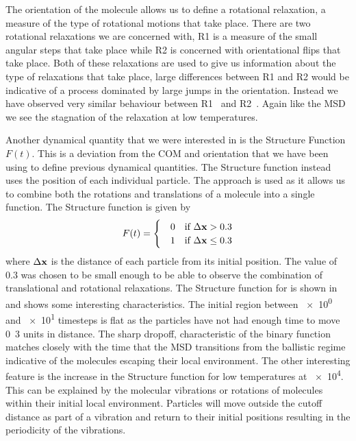 The orientation of the molecule allows us to define a rotational relaxation, a measure of the type of rotational motions that take place. There are two rotational relaxations we are concerned with, R1 is a measure of the small angular steps that take place while R2 is concerned with orientational flips that take place. Both of these relaxations are used to give us information about the type of relaxations that take place, large differences between R1 and R2 would be indicative of a process dominated by large jumps in the orientation. Instead we have observed very similar behaviour between R1~ and R2~. Again like the MSD we see the stagnation of the relaxation at low temperatures.

Another dynamical quantity that we were interested in is the Structure Function $F(t)$. This is a deviation from the COM and orientation that we have been using to define previous dynamical quantities. The Structure function instead uses the position of each individual particle. The approach is used as it allows us to combine both the rotations and translations of a molecule into a single function. The Structure function is given by
\begin{align}
    F(t) = \begin{cases}
        \quad0 &\text{if } \Delta \mathbf{x} > 0.3 \\
        \quad1 &\text{if } \Delta \mathbf{x} \leq 0.3
    \end{cases}
\end{align}
where $\Delta \mathbf{x}$ is the distance of each particle from its initial position. The value of $0.3$ was chosen to be small enough to be able to observe the combination of translational and rotational relaxations. The Structure function for \sone is shown in  and shows some interesting characteristics. The initial region between \num{e0} and \num{e1} timesteps is flat as the particles have not had enough time to move \si{0.3} units in distance. The sharp dropoff, characteristic of the binary function matches closely with the time that the MSD transitions from the ballistic regime indicative of the molecules escaping their local environment. The other interesting feature is the increase in the Structure function for low temperatures at \num{e4}. This can be explained by the molecular vibrations or rotations of molecules within their initial local environment. Particles will move outside the cutoff distance as part of a vibration and return to their initial positions resulting in the periodicity of the vibrations.

